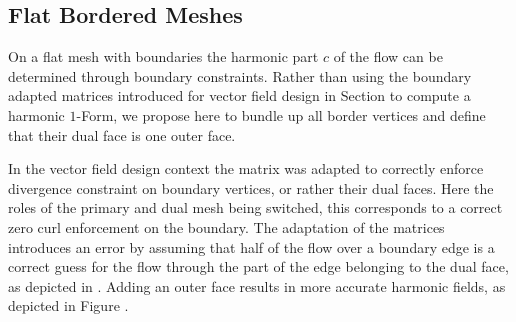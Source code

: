 \subsection{Flat Bordered Meshes}
On a flat mesh with boundaries the harmonic part $c$ of the flow can be determined through boundary constraints. Rather than using the boundary adapted matrices introduced for vector field design in Section  to compute a harmonic $1$-Form, we propose here to bundle up all border vertices and define that their dual face is one outer face. 

In the vector field design context the matrix was adapted to correctly enforce divergence constraint on boundary vertices, or rather their dual faces. Here the roles of the primary and dual mesh being switched, this corresponds to a correct zero curl enforcement on the boundary. The adaptation of the matrices introduces an error by assuming that half of the flow over a boundary edge is a correct guess for the flow through the part of the edge belonging to the dual face, as depicted in . Adding an outer face results in more accurate harmonic fields, as depicted in Figure .


